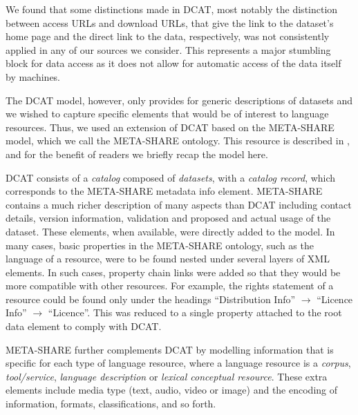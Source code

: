 \documentclass[smallextended]{svjour3}       %
\begin{document}
We found that some distinctions made in DCAT, most notably the distinction
between access URLs and download URLs, that give the link to the dataset's home
page and the direct link to the data, respectively, was not consistently applied
in any of our sources we consider. This represents a major stumbling block for
data access as it does not allow for automatic access of the data itself by
machines. 


The DCAT model, however, only provides for generic descriptions of datasets and
we wished to capture specific elements that would be of interest to language
resources.
Thus, we used an extension of DCAT based on the META-SHARE
model, which we call the META-SHARE ontology. This resource is described in
\cite{mccrae2015ontology}, and for the benefit of readers we briefly recap the
model here.

DCAT consists of a \emph{catalog} composed of \emph{datasets}, with a
\emph{catalog record}, which
corresponds to the META-SHARE metadata info element. META-SHARE contains a much
richer description of many aspects than DCAT including contact details, version
information, validation and proposed and actual usage of the dataset. These
elements, when available, were directly added to the model. In many cases, basic
properties in the META-SHARE ontology, such as the language of a resource, were
to be found nested under several layers of XML elements. In such cases, 
property chain links were added so that they would be more compatible with other resources.
For example, the rights statement of a resource could be found only under the 
headings ``Distribution Info'' $\rightarrow$ ``Licence Info'' $\rightarrow$
``Licence''. This was reduced to a single property attached to the root data
element to comply with DCAT\@.

META-SHARE further complements DCAT by modelling information
that is specific for each type of language resource, where a language resource
is a \emph{corpus},
\emph{tool/service}, \emph{language description} or \emph{lexical conceptual
resource}. These extra elements include media type (text, audio, video or image)
and the encoding of information, formats, classifications, and so forth.
\end{document}
